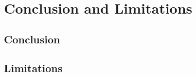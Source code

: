
\chapter{Conclusion and Limitations}
\label{conclusion-limitations}

\section{Conclusion}
\label{conclusion}

\section{Limitations}
\label{limitations}
